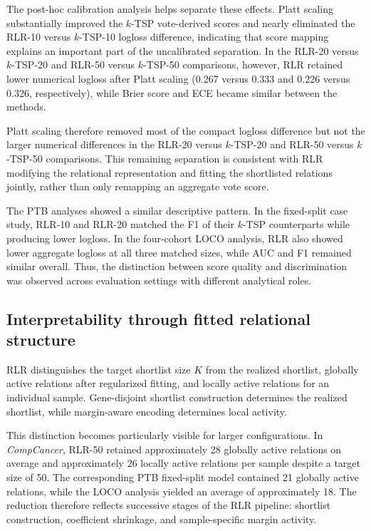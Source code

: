 \documentclass[preprint,12pt,a4paper]{elsarticle}
\begin{document}
The post-hoc calibration analysis helps separate these effects. Platt scaling substantially improved the $k$-TSP vote-derived scores and nearly eliminated the RLR-10 versus $k$-TSP-10 logloss difference, indicating that score mapping explains an important part of the uncalibrated separation. In the RLR-20 versus $k$-TSP-20 and RLR-50 versus $k$-TSP-50 comparisons, however, RLR retained lower numerical logloss after Platt scaling (0.267 versus 0.333 and 0.226 versus 0.326, respectively), while Brier score and ECE became similar between the methods.

Platt scaling therefore removed most of the compact logloss difference but not the larger numerical differences in the RLR-20 versus $k$-TSP-20 and RLR-50 versus $k$-TSP-50 comparisons. This remaining separation is consistent with RLR modifying the relational representation and fitting the shortlisted relations jointly, rather than only remapping an aggregate vote score.

The PTB analyses showed a similar descriptive pattern. In the fixed-split case study, RLR-10 and RLR-20 matched the F1 of their $k$-TSP counterparts while producing lower logloss. In the four-cohort LOCO analysis, RLR also showed lower aggregate logloss at all three matched sizes, while AUC and F1 remained similar overall. Thus, the distinction between score quality and discrimination was observed across evaluation settings with different analytical roles.

\subsection{Interpretability through fitted relational structure}

RLR distinguishes the target shortlist size $K$ from the realized shortlist, globally active relations after regularized fitting, and locally active relations for an individual sample. Gene-disjoint shortlist construction determines the realized shortlist, while margin-aware encoding determines local activity.

This distinction becomes particularly visible for larger configurations. In \emph{CompCancer}, RLR-50 retained approximately 28 globally active relations on average and approximately 26 locally active relations per sample despite a target size of 50. The corresponding PTB fixed-split model contained 21 globally active relations, while the LOCO analysis yielded an average of approximately 18. The reduction therefore reflects successive stages of the RLR pipeline: shortlist construction, coefficient shrinkage, and sample-specific margin activity.
\end{document}
